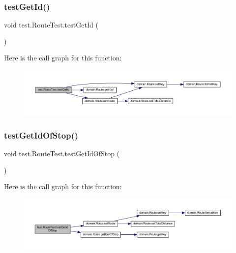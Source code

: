 \subsubsection{\texorpdfstring{test\+Get\+Id()}{testGetId()}}
{\footnotesize\ttfamily void test.\+Route\+Test.\+test\+Get\+Id (\begin{DoxyParamCaption}{ }\end{DoxyParamCaption})}

Here is the call graph for this function\+:\nopagebreak
\begin{figure}[H]
\begin{center}
\leavevmode
\includegraphics[width=350pt]{classtest_1_1_route_test_ae5d74fb8dedad7c5ee9d7aa1f6e181ca_cgraph}
\end{center}
\end{figure}
\mbox{\label{classtest_1_1_route_test_acaeec305d3d55c8bc78e90799de36632}} 
\subsubsection{\texorpdfstring{test\+Get\+Id\+Of\+Stop()}{testGetIdOfStop()}}
{\footnotesize\ttfamily void test.\+Route\+Test.\+test\+Get\+Id\+Of\+Stop (\begin{DoxyParamCaption}{ }\end{DoxyParamCaption})}

Here is the call graph for this function\+:\nopagebreak
\begin{figure}[H]
\begin{center}
\leavevmode
\includegraphics[width=350pt]{classtest_1_1_route_test_acaeec305d3d55c8bc78e90799de36632_cgraph}
\end{center}
\end{figure}
\mbox{\label{classtest_1_1_route_test_a11cca1688e58c33a830799aabf3c193f}} 
